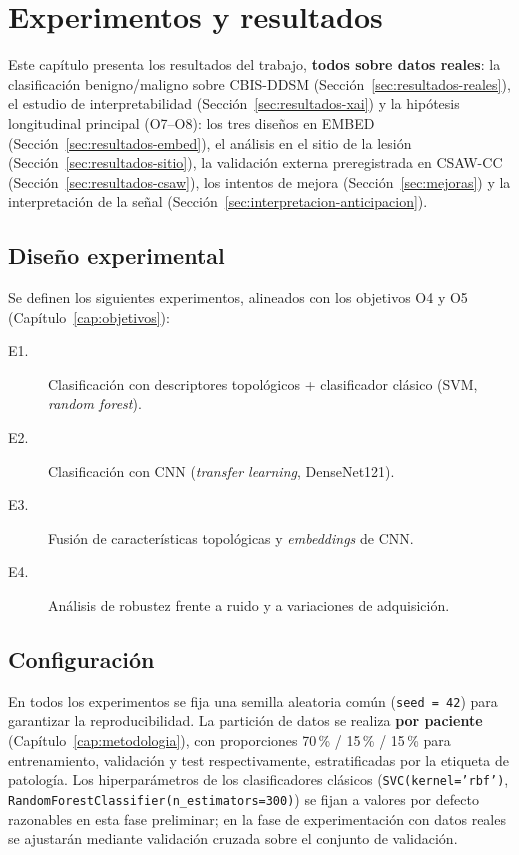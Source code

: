 \chapter{Experimentos y resultados}
\label{cap:resultados}

Este capítulo presenta los resultados del trabajo, \textbf{todos sobre
datos reales}: la clasificación benigno/maligno sobre CBIS-DDSM
(Sección~\ref{sec:resultados-reales}), el estudio de interpretabilidad
(Sección~\ref{sec:resultados-xai}) y la hipótesis longitudinal principal
(O7--O8): los tres diseños en EMBED (Sección~\ref{sec:resultados-embed}), el
análisis en el sitio de la lesión (Sección~\ref{sec:resultados-sitio}), la
validación externa preregistrada en CSAW-CC (Sección~\ref{sec:resultados-csaw}),
los intentos de mejora (Sección~\ref{sec:mejoras}) y la interpretación de la
señal (Sección~\ref{sec:interpretacion-anticipacion}).

\section{Diseño experimental}
Se definen los siguientes experimentos, alineados con los objetivos O4 y O5
(Capítulo~\ref{cap:objetivos}):
\begin{description}
  \item[E1.] Clasificación con descriptores topológicos + clasificador clásico
        (SVM, \textit{random forest}).
  \item[E2.] Clasificación con CNN (\textit{transfer learning}, DenseNet121).
  \item[E3.] Fusión de características topológicas y \textit{embeddings} de CNN.
  \item[E4.] Análisis de robustez frente a ruido y a variaciones de adquisición.
\end{description}

\section{Configuración}
En todos los experimentos se fija una semilla aleatoria común
(\texttt{seed = 42}) para garantizar la reproducibilidad. La partición de datos
se realiza \textbf{por paciente} (Capítulo~\ref{cap:metodologia}), con
proporciones 70\,\% / 15\,\% / 15\,\% para entrenamiento, validación y
test respectivamente, estratificadas por la etiqueta de patología. Los
hiperparámetros de los clasificadores clásicos (\texttt{SVC(kernel='rbf')},
\texttt{RandomForestClassifier(n\_estimators=300)}) se fijan a valores por
defecto razonables en esta fase preliminar; en la fase de experimentación con
datos reales se ajustarán mediante validación cruzada sobre el conjunto de
validación.

